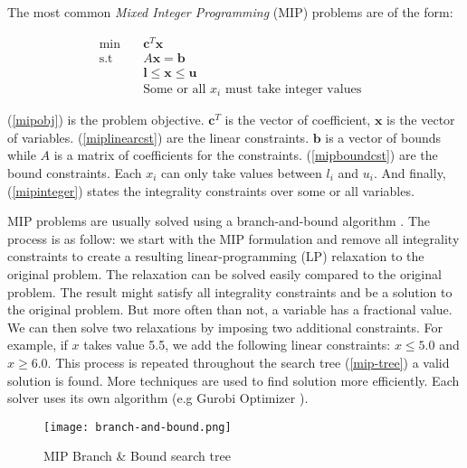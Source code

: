 \documentclass[../../thesis.tex]{subfiles}
\begin{document}
The most common \emph{Mixed Integer Programming} (MIP) problems are of the form:

\begin{align}
  \textrm{min} \quad & \bm{c}^T\bm{x} & \label{mipobj} \\ 
  \textrm{s.t} \quad & A\bm{x} = \bm{b} & \label{miplinearcst} \\
   & \bm{l} \leq \bm{x} \leq \bm{u} & \label{mipboundcst} \\
   & \text{Some or all $x_i$ must take integer values} \label{mipinteger}
\end{align}

(\ref{mipobj}) is the problem objective. $\bm{c}^T$ is the vector of coefficient, $\bm{x}$ is the vector of variables.
(\ref{miplinearcst}) are the linear constraints. $\bm{b}$ is a vector of bounds while $A$ is a matrix of coefficients for the constraints.
(\ref{mipboundcst}) are the bound constraints. Each $x_i$ can only take values between $l_i$ and $u_i$.
And finally, (\ref{mipinteger}) states the integrality constraints over some or all variables.


MIP problems are usually solved using a branch-and-bound algorithm \cite{mip-basics}.
The process is as follow: we start with the MIP formulation and remove all integrality constraints 
to create a resulting linear-programming (LP) relaxation to the original problem. The relaxation can be solved 
easily compared to the original problem. The result might satisfy all integrality constraints and be a solution to the original problem.
But more often than not, a variable has a fractional value.
We can then solve two relaxations by imposing two additional constraints. For example, if $x$ takes value 5.5, we add the 
following linear constraints: $x \leq 5.0$ and $x \geq 6.0$. 
This process is repeated throughout the search tree (\autoref{mip-tree}) a valid solution is found.
More techniques are used to find solution more efficiently. Each solver uses its
own algorithm (e.g Gurobi Optimizer \cite{mip-basics}).

\begin{figure}
  \centering
  \texttt{[image: branch-and-bound.png]}
  \caption{MIP Branch \& Bound search tree \cite{mip-basics}}
  \label{mip-tree}
\end{figure}
\end{document}
